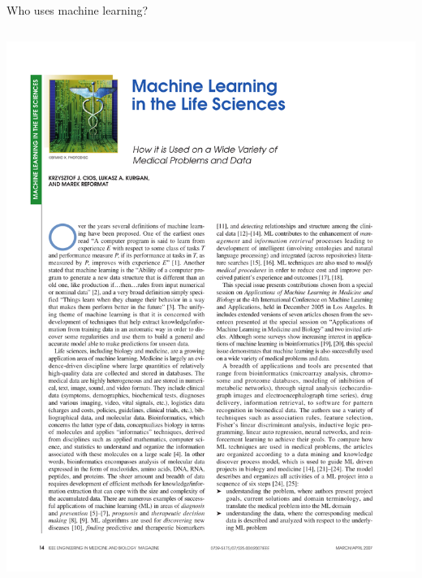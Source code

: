 \documentclass[pdf]{beamer}
\begin{document}
\begin{frame}{Who uses machine learning?}
\begin{columns}
\begin{center}
	\includegraphics[width=\textwidth]{useML03.pdf}\\
	\vspace{2cm}

\end{center}
\end{columns}
\end{frame}
\end{document}
